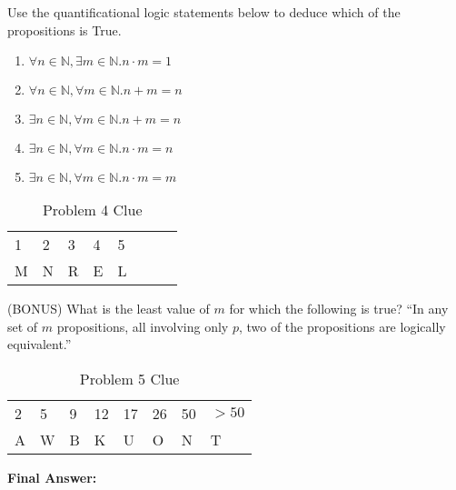 \documentclass[solution, letterpaper]{cs20inclass}
\begin{document}
\begin{solution}
\end{solution}

\problem Use the quantificational logic statements below to deduce which of the propositions is True.

\begin{enumerate}
\item $\forall n \in \mathbb{N}, \exists m \in \mathbb{N} . n\cdot m = 1$
\item $\forall n \in \mathbb{N}, \forall m \in \mathbb{N} . n+m = n$
\item $\exists n \in \mathbb{N}, \forall m \in \mathbb{N} . n+m = n$
\item $\exists n \in \mathbb{N}, \forall m \in \mathbb{N} . n\cdot m = n$
\item $\exists n \in \mathbb{N}, \forall m \in \mathbb{N} . n\cdot m = m$
\end{enumerate}

\begin{table}[h]
\centering
\begin{tabular}{llllllll}
1 & 2 & 3 & 4 & 5 \\
M & N & R & E & L
\end{tabular}
\caption{Problem 4 Clue}
\end{table}

\begin{solution}
\end{solution}

\problem (BONUS) What is the least value of $m$ for which the following is true? ``In any set of $m$ propositions, all involving only $p$, two of the propositions are logically equivalent.''

\begin{table}[h]
\centering
\begin{tabular}{llllllll}
2 & 5 & 9 & 12 & 17 & 26 & 50 & $>50$ \\
A & W & B & K & U & O & N & T
\end{tabular}
\caption{Problem 5 Clue}
\end{table}

\begin{solution}
\end{solution}

\problem \textbf{Final Answer: }

\begin{solution}
\end{solution}
\end{document}
